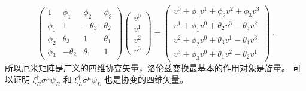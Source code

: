 \begin{equation}
\left(\begin{array}{cccc}1 & \phi_{1} & \phi_{2} & \phi_{3} \\ \phi_{1} & 1 & -\theta_{3} & \theta_{2} \\ \phi_{2} & \theta_{3} & 1 & \theta_{1} \\ \phi_{3} & -\theta_{2} & \theta_{1} & 1\end{array}\right)\left(\begin{array}{c}v^{0} \\ v^{1} \\ v^{2} \\ v^{3}\end{array}\right)=\left(\begin{array}{c}v^{0}+\phi_{1} v^{1}+\phi_{2} v^{2}+\phi_{3} v^{3} \\ v^{1}+\phi_{1} v^{0}+\theta_{2} v^{3}-\theta_{3} v^{2} \\ v^{2}+\phi_{2} v^{0}+\theta_{3} v^{1}-\theta_{1} v^{3} \\ v^{3}+\phi_{3} v^{0}+\theta_{1} v^{2}-\theta_{2} v^{1}\end{array}\right)~.
\end{equation}
所以厄米矩阵是广义的四维协变矢量，洛伦兹变换最基本的作用对象是旋量。
可以证明 $\xi_{R}^{\dagger} \sigma^{\mu} \psi_{R}$ 和 $\xi_{L}^{\dagger} \bar{\sigma}^{\mu} \psi_{L}$ 也是协变的四维矢量。
